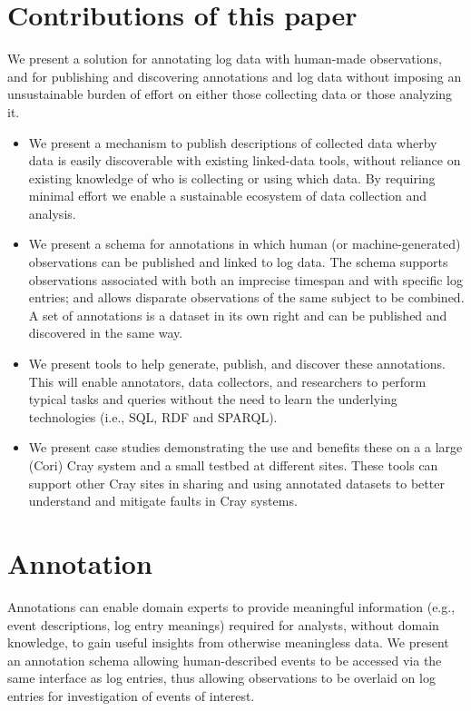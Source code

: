 \section{Contributions of this paper}
We present a solution for annotating log data with human-made observations, and
for publishing and discovering annotations and log data without imposing an
unsustainable burden of effort on either those collecting data or those
analyzing it.

\begin{itemize}
\item We present a mechanism to publish descriptions of collected data
wherby data is easily discoverable with existing linked-data tools, without
reliance on existing knowledge of who is collecting or using which data.
By requiring minimal effort we enable a sustainable ecosystem of data collection
and analysis.

\item We present a schema for annotations in which human (or machine-generated)
observations can be published and linked to log data. The schema supports
observations associated with both an imprecise timespan and with specific log
entries; and allows disparate observations of the same subject to be combined. A
set of annotations is a dataset in its own right and can be published and
discovered in the same way.

\item We present tools to help generate, publish, and discover these annotations.
This will enable annotators, data collectors, and researchers to perform typical tasks
and queries without the need to learn the underlying technologies (i.e.,
SQL, RDF and SPARQL).

\item We present case studies demonstrating the use and benefits these on a
a large (Cori) Cray system and a small testbed at different sites.
These tools can support other Cray
sites in sharing and using annotated datasets to better understand and mitigate
faults
in Cray systems.
\end{itemize}

\section{Annotation}
Annotations can enable domain experts to provide meaningful information 
(e.g., event descriptions, log entry meanings) required for analysts, without 
domain knowledge, to gain useful insights from otherwise meaningless data.
We present an annotation schema allowing human-described events to
be accessed via the same interface as log entries, thus allowing observations
to be overlaid on log entries for investigation of events of interest.

